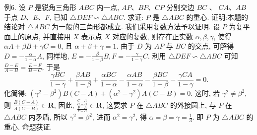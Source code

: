 例6. 设 $P$ 是锐角三角形 $A B C$ 内一点, $A P 、 B P 、 C P$ 分别交边 $B C$ 、 $C A 、 A B$ 于点 $D 、 E 、 F$, 已知 $\triangle D E F \backsim \triangle A B C$. 求证: $P$ 是 $\triangle A B C$ 的重心.
证明:本题的结论对 $\triangle A B C$ 为一般的三角形都成立.
我们采用复数方法予以证明.
设 $P$ 为复平面上的原点, 并直接用 $X$ 表示点 $X$ 对应的复数, 则存在正实数 $\alpha, \beta, \gamma$, 使得 $\alpha A+\beta B+\gamma C=0$, 且 $\alpha+\beta+\gamma=1$.
由于 $D$ 为 $A P$ 与 $B C$ 的交点, 可解得 $D=-\frac{\alpha}{1-\alpha} A$, 同样地, $E= -\frac{\beta}{1-\beta} B, F=-\frac{\gamma}{1-\gamma} C$. 利用 $\triangle D E F \backsim \triangle A B C$ 可知 $\frac{D-E}{A-B}=\frac{E-F}{B-C}$, 于是
$$
\frac{\gamma B C}{1-\gamma}+\frac{\beta A B}{1-\beta}+\frac{\alpha B C}{1-\alpha}-\frac{\alpha A B}{1-\alpha}-\frac{\beta B C}{1-\beta}-\frac{\gamma C A}{1-\gamma}=0 .
$$
化简得: $\left(\gamma^2-\beta^2\right) B(C-A)+\left(\alpha^2-\gamma^2\right) A(C-B)=0$. 这时, 若 $\gamma^2 \neq \beta^2$, 则 $\frac{B(C-A)}{A(C-B)} \in \mathbf{R}$, 因此, $\frac{\frac{C-A}{C-B}}{\frac{P-A}{P-B}} \in \mathbf{R}$, 这要求 $P$ 在 $\triangle A B C$ 的外接圆上, 与 $P$ 在 $\triangle A B C$ 内矛盾, 所以 $\gamma^2=\beta^2$, 进而 $\alpha^2=\gamma^2$, 得 $\alpha=\beta=\gamma=\frac{1}{3}$. 即 $P$ 为 $\triangle A B C$ 的重心.
命题获证.



